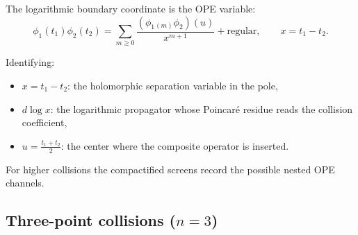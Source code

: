 \begin{remark}
The logarithmic boundary coordinate is the OPE variable:
\[
\phi_1(t_1)\phi_2(t_2)
=
\sum_{m\geq 0}\frac{(\phi_1{}_{(m)}\phi_2)(u)}{x^{m+1}}
+\text{regular},\qquad x=t_1-t_2 .
\]

Identifying:
\begin{itemize}
\item $x=t_1-t_2$: the holomorphic separation variable in the pole,
\item $d\log x$: the logarithmic propagator whose Poincar\'e residue
reads the collision coefficient,
\item $u=\frac{t_1+t_2}{2}$: the center where the composite operator is inserted.
\end{itemize}

For higher collisions the compactified screens record the possible
nested OPE channels.
\end{remark}

\subsection{\texorpdfstring{Three-point collisions ($n=3$)}{Three-point collisions (n=3)}}

